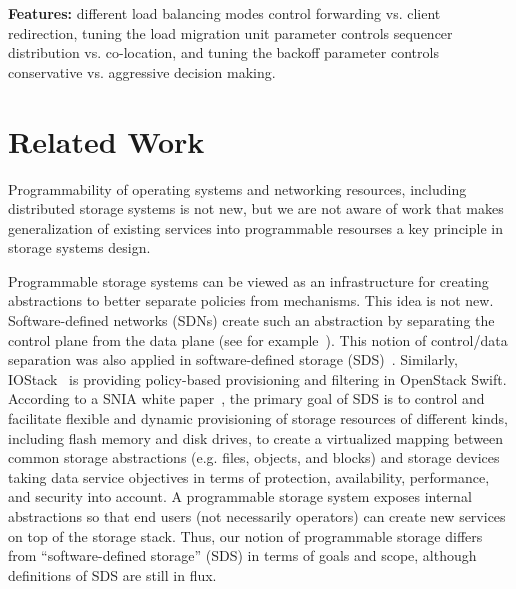 \documentclass[preprint]{sigplanconf-eurosys}
\begin{document}
\noindent\textbf{Features:} different load balancing modes control forwarding
vs. client redirection, tuning the load migration unit parameter controls
sequencer distribution vs. co-location, and tuning the backoff parameter
controls conservative vs.  aggressive decision making.

%
%
%

\section{Related Work}


Programmability of operating systems and networking resources, including
distributed storage systems is not new, but we are not aware of work that makes
generalization of existing services into programmable resourses a key principle
in storage systems design. 

Programmable storage systems can be viewed as an infrastructure for creating
abstractions to better separate policies from mechanisms. This idea is not new.
Software-defined networks (SDNs) create such an abstraction by separating the
control plane from the data plane (see for example~\cite{jain:sigcomm13}). This
notion of control/data separation was also applied in software-defined storage
(SDS)~\cite{thereska:sosp13,stefanovici:fast16}. Similarly,
IOStack~\cite{gracia:internet16} is providing policy-based provisioning and
filtering in OpenStack Swift. According to a SNIA white
paper~\cite{carlson:snia2014}, the primary goal of SDS is to control and
facilitate flexible and dynamic provisioning of storage resources of different
kinds, including flash memory and disk drives, to create a virtualized mapping
between common storage abstractions (e.g. files, objects, and blocks) and
storage devices taking data service objectives in terms of protection,
availability, performance, and security into account. A programmable storage
system exposes internal abstractions so that end users (not necessarily
operators) can create new services on top of the storage stack. Thus, our
notion of programmable storage differs from ``software-defined storage'' (SDS)
in terms of goals and scope, although definitions of SDS are still in flux.
\end{document}

